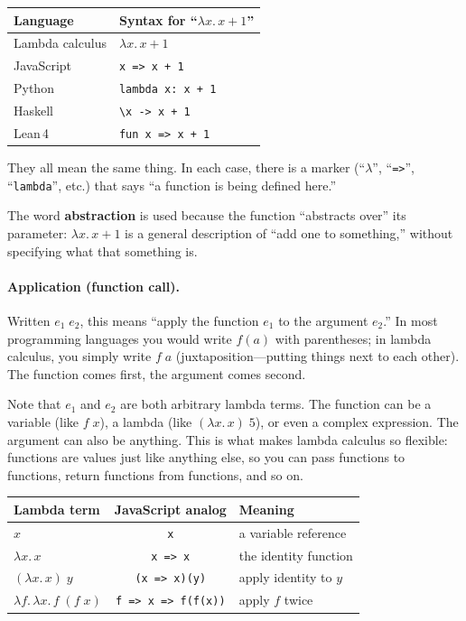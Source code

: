 \documentclass[11pt,a4paper]{article}
\theoremstyle{definition}
\newcommand{\lam}{\lambda}
\begin{document}
\begin{center}
\renewcommand{\arraystretch}{1.4}
\begin{tabular}{ll}
\textbf{Language} & \textbf{Syntax for ``$\lam x.\, x + 1$''} \\
\hline
Lambda calculus & $\lam x.\, x + 1$ \\
JavaScript & \texttt{x => x + 1} \\
Python & \texttt{lambda x: x + 1} \\
Haskell & \texttt{\textbackslash x -> x + 1} \\
Lean\,4 & \texttt{fun x => x + 1} \\
\end{tabular}
\end{center}

They all mean the same thing. In each case, there is a marker (``$\lam$'',
``\texttt{=>}'', ``\texttt{lambda}'', etc.) that says ``a function is being
defined here.''

The word \textbf{abstraction} is used because the function ``abstracts over''
its parameter: $\lam x.\, x + 1$ is a general description of ``add one to
something,'' without specifying what that something is.

\paragraph{Application (function call).} Written $e_1\; e_2$, this means
``apply the function $e_1$ to the argument $e_2$.'' In most programming
languages you would write $f(a)$ with parentheses; in lambda calculus, you
simply write $f\; a$ (juxtaposition---putting things next to each other).
The function comes first, the argument comes second.

Note that $e_1$ and $e_2$ are both arbitrary lambda terms. The function can
be a variable (like $f\; x$), a lambda (like $(\lam x.\, x)\; 5$), or even
a complex expression. The argument can also be anything. This is what makes
lambda calculus so flexible: functions are values just like anything else, so
you can pass functions to functions, return functions from functions, and so on.

\medskip
\begin{center}
\renewcommand{\arraystretch}{1.5}
\begin{tabular}{lcl}
  \textbf{Lambda term} & \textbf{JavaScript analog} & \textbf{Meaning} \\
  \hline
  $x$ & \texttt{x} & a variable reference \\
  $\lam x.\, x$ & \texttt{x => x} & the identity function \\
  $(\lam x.\, x)\; y$ & \texttt{(x => x)(y)} & apply identity to $y$ \\
  $\lam f.\, \lam x.\, f\;(f\;x)$ & \texttt{f => x => f(f(x))} & apply $f$ twice \\
\end{tabular}
\end{center}
\end{document}
